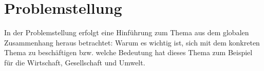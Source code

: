 

\section{Problemstellung}\label{cha:problem}
In der Problemstellung erfolgt eine Hinführung zum Thema aus dem globalen Zusammenhang heraus betrachtet: 
Warum es wichtig ist, sich mit dem konkreten Thema zu beschäftigen bzw. welche Bedeutung hat dieses Thema zum Beispiel für die Wirtschaft, Gesellschaft und Umwelt.
\autocite[24]{ederer2024}